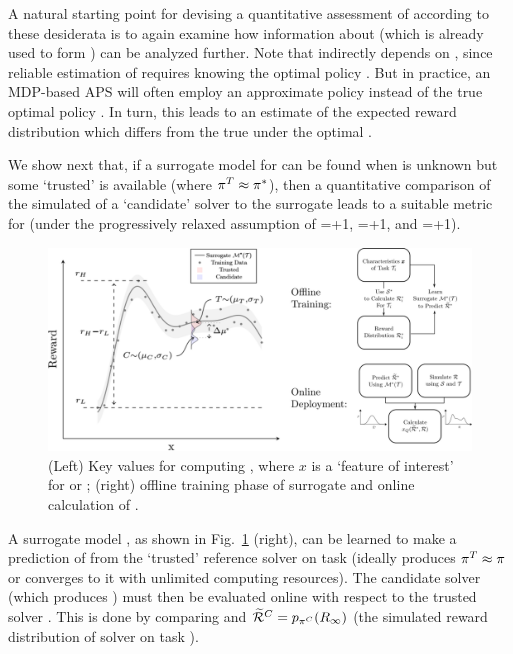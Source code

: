 A natural starting point for devising a quantitative assessment of \xQ{} according to these desiderata is to again examine how information about \rwdapprox{} (which is already used to form \xO{}) can be analyzed further. 
Note that \xO{} indirectly depends on \xQ{}, since reliable estimation of \rwdoptapprox{} requires knowing the optimal policy \piopt. But in practice, an MDP-based APS will often employ an approximate policy \piapprox{} instead of the true optimal policy \piopt. In turn, this leads to an estimate \rwdapprox{} of the expected reward distribution which differs from the true \rwdopt{} under the optimal \piopt.

 We show next that, if a surrogate model for \rwdtrust{} can be found when \piopt{} is unknown but some `trusted' \pitrust{} is available (where $\pi^T \approx \pi^*$), then a quantitative comparison of the simulated \rwdcandsim{} of a `candidate' solver to the surrogate \rwdpredicted{} leads to a suitable metric for \xQ{} (under the progressively relaxed assumption of \xM{}=+1, \xP{}=+1, and \xI{}=+1).\brett{********}
    \begin{figure}[tb]
        \centering
        \includegraphics[width=0.79\linewidth]{Figures/SQ_AllCombined.png}
        \caption{(Left) Key values for computing \xQ, where $x$ is a `feature of interest' for \task or \solve; (right) offline training phase of surrogate \surrogate{} and online calculation of \xQ{}. }
        \label{fig:sq_v3}
        \vspace{-0.2cm}
    \end{figure}

A surrogate model \surrogate{}, as shown in Fig.~\ref{fig:sq_v3} (right), can be learned to make a prediction \rwdtrustpredict{} of \rwdtrust{} from the `trusted' reference solver \solvetrust{} on task \task{} (ideally \solvetrust{} produces $\mathcal{\pi}^T \approx \mathcal{\pi}$ or converges to it with unlimited computing resources). The candidate solver \solvecand{} (which produces \policycand) must then be evaluated online with respect to the trusted solver \solvetrust{}. This is done by comparing \rwdtrustpredict{} and $\widetilde{\mathcal{R}}^C= p_{\pi^C}(R_{\infty})$ (the simulated reward distribution of solver \solvecand{} on task \task). 

